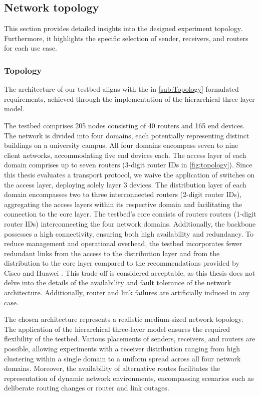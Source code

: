 \subsection{Network topology} %
\label{sub:Network Topology}
This section provides detailed insights into the designed experiment topology.
Furthermore, it highlights the specific selection of sender, receivers, and
    routers for each use case.

\subsubsection{Topology} %
\label{sec:Topology}
The architecture of our testbed aligns with the in \autoref{sub:Topology}
    formulated requirements, achieved through the implementation of the
    hierarchical three-layer model.

The testbed comprises 205 nodes consisting of 40 routers and 165 end devices.
The network is divided into four domains, each potentially representing distinct
    buildings on a university campus.
All four domains encompass seven to nine client networks, accommodating five
    end devices each.
The access layer of each domain comprises up to seven routers (3-digit router IDs
    in \autoref{fig:topology}).
Since this thesis evaluates a transport protocol, we waive the application of
    switches on the access layer, deploying solely layer 3 devices.
The distribution layer of each domain encompasses two to three interconnected routers
    (2-digit router IDs), aggregating the access layers within its respective
    domain and facilitating the connection to the core layer.
The testbed's core consists of routers routers (1-digit router IDs) interconnecting
    the four network domains.
Additionally, the backbone possesses a high connectivity, ensuring both high
    availability and redundancy.
To reduce management and operational overhead, the testbed incorporates fewer
    redundant links from the access to the distribution layer and from the
    distribution to the core layer compared to the recommendations provided by
    Cisco and Huawei \cite{cisco_design_guide,huawei_campus_net}.
This trade-off is considered acceptable, as this thesis does not delve into the
    details of the availability and fault tolerance of the network
    architecture.
Additionally, router and link failures are artificially induced in any case.

The chosen architecture represents a realistic medium-sized network topology.
The application of the hierarchical three-layer model ensures the required
    flexibility of the testbed.
Various placements of senders, receivers, and routers are possible, allowing
    experiments with a receiver distribution ranging from high clustering
    within a single domain to a uniform spread across all four network domains.
Moreover, the availability of alternative routes facilitates the representation
    of dynamic network environments, encompassing scenarios such as deliberate
    routing changes or router and link outages.

